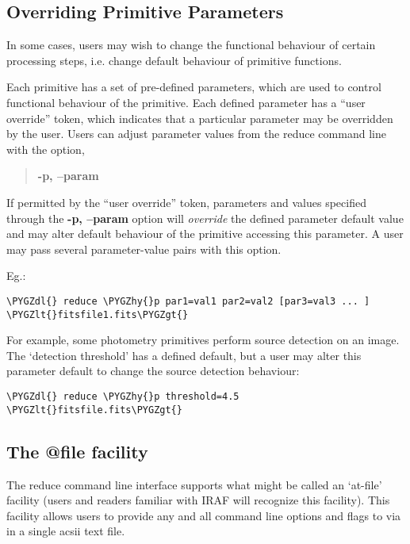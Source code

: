 \documentclass[letterpaper,10pt,english]{sphinxmanual}
\def\PYGZlt{\char`\<}
\def\PYGZgt{\char`\>}
\def\PYGZdl{\char`\$}
\def\PYGZhy{\char`\-}
\begin{document}
\subsection{Overriding Primitive Parameters}
\label{interfaces:userpars}\label{interfaces:overriding-primitive-parameters}
In some cases, users may wish to change the functional behaviour of certain
processing steps, i.e. change default behaviour of primitive
functions.

Each primitive has a set of pre-defined parameters, which are used to control
functional behaviour of the primitive. Each defined parameter has a ``user
override'' token, which indicates that a particular parameter may be overridden
by the user. Users can adjust parameter values from the reduce command line with
the option,
\begin{quote}

\textbf{-p, --param}
\end{quote}

If permitted by the ``user override'' token, parameters and values specified
through the \textbf{-p, --param} option will \emph{override} the defined
parameter default value and may alter default behaviour of the primitive
accessing this parameter. A user may pass several parameter-value pairs with
this option.

Eg.:

\begin{Verbatim}[commandchars=\\\{\}]
\PYGZdl{} reduce \PYGZhy{}p par1=val1 par2=val2 [par3=val3 ... ] \PYGZlt{}fitsfile1.fits\PYGZgt{}
\end{Verbatim}

For example, some photometry primitives perform source detection on an image.
The `detection threshold' has a defined default, but a user may alter this
parameter default to change the source detection behaviour:

\begin{Verbatim}[commandchars=\\\{\}]
\PYGZdl{} reduce \PYGZhy{}p threshold=4.5 \PYGZlt{}fitsfile.fits\PYGZgt{}
\end{Verbatim}


\subsection{The @file facility}
\label{interfaces:the-file-facility}\label{interfaces:atfile}
The reduce command line interface supports what might be called an `at-file'
facility (users and readers familiar with IRAF will recognize this facility).
This facility allows users to provide any and all command line options and flags
to  via in a single acsii text file.
\end{document}
